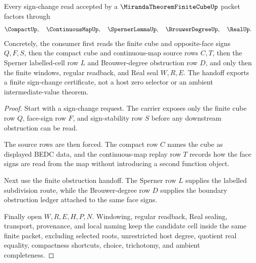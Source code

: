 \begin{theorem}
\label{thm:miranda-theorem-sign-change-handoff}
Every sign-change read accepted by a $\MirandaTheoremFiniteCubeUp$ packet factors through
$$
\CompactUp,\quad
\ContinuousMapUp,\quad
\SpernerLemmaUp,\quad
\BrouwerDegreeUp,\quad
\RealUp .
$$
Concretely, the consumer first reads the finite cube and opposite-face signs $Q,F,S$, then the compact cube and continuous-map source rows $C,T$, then the Sperner labelled-cell row $L$ and Brouwer-degree obstruction row $D$, and only then the finite windows, regular readback, and Real seal $W,R,E$. The handoff exports a finite sign-change certificate, not a host zero selector or an ambient intermediate-value theorem.
\end{theorem}
\begin{proof}
Start with a sign-change request. The carrier exposes only the finite cube row $Q$, face-sign row $F$, and sign-stability row $S$ before any downstream obstruction can be read.

The source rows are then forced. The compact row $C$ names the cube as displayed BEDC data, and the continuous-map replay row $T$ records how the face signs are read from the map without introducing a second function object.

Next use the finite obstruction handoff. The Sperner row $L$ supplies the labelled subdivision route, while the Brouwer-degree row $D$ supplies the boundary obstruction ledger attached to the same face signs.

Finally open $W,R,E,H,P,N$. Windowing, regular readback, Real sealing, transport, provenance, and local naming keep the candidate cell inside the same finite packet, excluding selected roots, unrestricted host degree, quotient real equality, compactness shortcuts, choice, trichotomy, and ambient completeness.
\end{proof}



